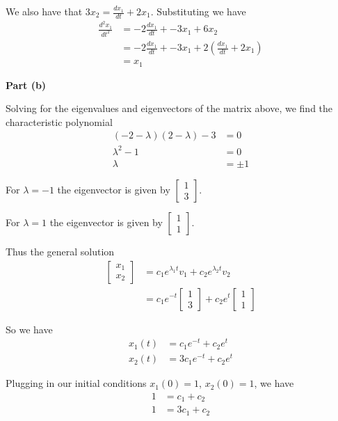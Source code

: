 \documentclass[final,12pt,reqno]{amsart}
\begin{document}
We also have that $3x_2 = \frac{dx_1}{dt} + 2x_1$. Substituting we have
\begin{align*}
	\frac{d^2x_1}{dt^2} &= -2\frac{dx_1}{dt} + -3x_1 + 6x_2\\
						&= -2\frac{dx_1}{dt} + -3x_1 + 2(\frac{dx_1}{dt} + 2x_1)\\
						&= x_1
\end{align*}

\textbf{Part (b)}

Solving for the eigenvalues and eigenvectors of the matrix above, we find the characteristic polynomial
\begin{align*}
	(-2-\lambda)(2-\lambda)-3 &= 0\\
	\lambda^2 - 1 &= 0\\
	\lambda &= \pm 1
\end{align*}

For $\lambda = -1$ the eigenvector is given by $\begin{bmatrix} 1\\ 3 \end{bmatrix}$.

For $\lambda = 1$ the eigenvector is given by $\begin{bmatrix} 1\\ 1 \end{bmatrix}$.

Thus the general solution
\begin{align*}
	\begin{bmatrix}
		x_1\\
		x_2
	\end{bmatrix}
	&= c_1e^{\lambda_1t}v_1 + c_2e^{\lambda_2t}v_2\\
	&= c_1e^{-t} \begin{bmatrix} 1\\ 3 \end{bmatrix} + c_2e^{t}\begin{bmatrix} 1\\ 1 \end{bmatrix}
\end{align*}

So we have
\begin{align*}
	x_1(t) &= c_1e^{-t} + c_2e^t\\
	x_2(t) &= 3c_1e^{-t} + c_2e^t
\end{align*}

Plugging in our initial conditions $x_1(0) = 1$, $x_2(0) = 1$, we have
\begin{align*}
	1 &= c_1 + c_2\\
	1 &= 3c_1 + c_2
\end{align*}
\end{document}
